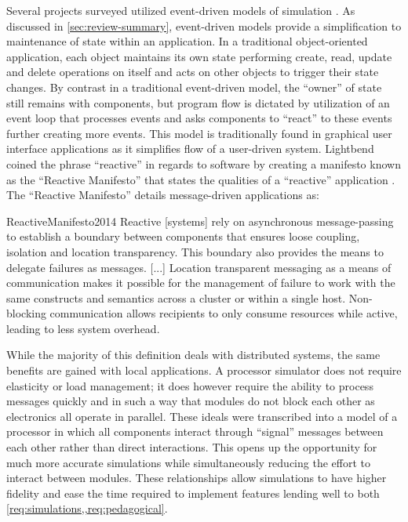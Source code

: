 Several projects surveyed utilized event-driven models of simulation \cite{Nakamura2013, McLoughlin2010, Garcia2009}. As discussed in \cref{sec:review-summary}, event-driven models provide a simplification to maintenance of state within an application. In a traditional object-oriented application, each object maintains its own state performing create, read, update and delete operations on itself and acts on other objects to trigger their state changes. By contrast in a traditional event-driven model, the ``owner'' of state still remains with components, but program flow is dictated by utilization of an event loop that processes events and asks components to ``react'' to these events further creating more events. This model is traditionally found in graphical user interface applications as it simplifies flow of a user-driven system. Lightbend coined the phrase ``reactive'' in regards to software by creating a manifesto known as the ``Reactive Manifesto'' that states the qualities of a ``reactive'' application \cite{ReactiveManifesto2014}. The ``Reactive Manifesto'' details message-driven applications as: 
\begin{displaycquote}{ReactiveManifesto2014}
    Reactive [systems] rely on asynchronous message-passing to establish a boundary between components that ensures loose coupling, isolation and location transparency. This boundary also provides the means to delegate failures as messages. [...] Location transparent messaging as a means of communication makes it possible for the management of failure to work with the same constructs and semantics across a cluster or within a single host. Non-blocking communication allows recipients to only consume resources while active, leading to less system overhead.
\end{displaycquote}
While the majority of this definition deals with distributed systems, the same benefits are gained with local applications. A processor simulator does not require elasticity or load management; it does however require the ability to process messages quickly and in such a way that modules do not block each other as electronics all operate in parallel. These ideals were transcribed into a model of a processor in which all components interact through ``signal'' messages between each other rather than direct interactions. This opens up the opportunity for much more accurate simulations while simultaneously reducing the effort to interact between modules. These relationships allow simulations to have higher fidelity and ease the time required to implement features lending well to both \cref{req:simulations,,req:pedagogical}. 

